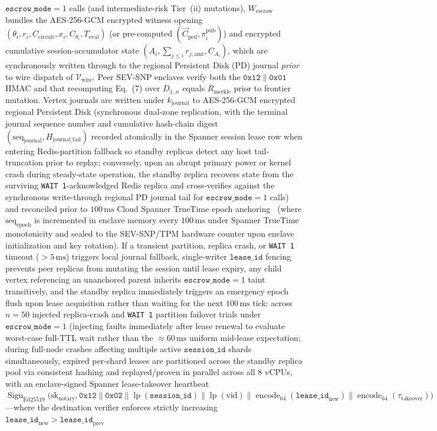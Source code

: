 \documentclass[conference,10pt]{IEEEtran}
\begin{document}
{\begin{enumerate}
$\texttt{escrow\_mode} = 1$ calls (and intermediate-risk Tier~(ii) mutations), $W_{\text{escrow}}$ bundles the AES-256-GCM encrypted witness opening $(\theta_i, r_i, C_{\text{circuit}}, x_i, C_{\theta_i}, T_{\text{eval}})$ (or pre-computed $(\vec{C}_{\text{ped}}, \pi_i^{\text{pub}})$) and encrypted cumulative session-accumulator state $(A_i, \sum_{j \le i} r_{j,\text{amt}}, C_{A_i})$, which are synchronously written through to the regional Persistent Disk (PD) journal \emph{prior} to wire dispatch of $\mathcal{V}_{\text{wire}}$. Peer SEV-SNP enclaves verify both the $\mathtt{0x12} \parallel \mathtt{0x01}$ HMAC and that recomputing Eq.~(7) over $D_{1..n}$ equals $R_{\text{merkle}}$ prior to frontier mutation. Vertex journals are written under $k_{\text{journal}}$ to AES-256-GCM encrypted regional Persistent Disk (synchronous dual-zone replication, with the terminal journal sequence number and cumulative hash-chain digest $(\text{seq}_{\text{journal}}, H_{\text{journal\_tail}})$ recorded atomically in the Spanner session lease row when entering Redis-partition fallback so standby replicas detect any host tail-truncation prior to replay; conversely, upon an abrupt primary power or kernel crash during steady-state operation, the standby replica recovers state from the surviving \texttt{WAIT 1}-acknowledged Redis replica and cross-verifies against the synchronous write-through regional PD journal tail for $\texttt{escrow\_mode} = 1$ calls) and reconciled prior to $100\,\text{ms}$ Cloud Spanner TrueTime epoch anchoring~\cite{corbett2013spanner} (where $\text{seq}_{\text{epoch}}$ is incremented in enclave memory every $100\,\text{ms}$ under Spanner TrueTime monotonicity and sealed to the SEV-SNP/TPM hardware counter upon enclave initialization and key rotation). If a transient partition, replica crash, or \texttt{WAIT 1} timeout ($> 5\,\text{ms}$) triggers local journal fallback, single-writer $\texttt{lease\_id}$ fencing prevents peer replicas from mutating the session until lease expiry, any child vertex referencing an unanchored parent inherits $\texttt{escrow\_mode} = 1$ taint transitively, and the standby replica immediately triggers an emergency epoch flush upon lease acquisition rather than waiting for the next $100\,\text{ms}$ tick: across $n = 50$ injected replica-crash and \texttt{WAIT 1} partition failover trials under $\texttt{escrow\_mode} = 1$ (injecting faults immediately after lease renewal to evaluate worst-case full-TTL wait rather than the $\approx 60\,\text{ms}$ uniform mid-lease expectation; during full-node crashes affecting multiple active $\texttt{session\_id}$ shards simultaneously, expired per-shard leases are partitioned across the standby replica pool via consistent hashing and replayed/proven in parallel across all 8 vCPUs, with an enclave-signed Spanner lease-takeover heartbeat $\operatorname{Sign}_{\text{Ed25519}}\big(\text{sk}_{\text{notary}}, \mathtt{0x12} \parallel \mathtt{0x02} \parallel \operatorname{lp}(\texttt{session\_id}) \parallel \operatorname{lp}(\text{vid}) \parallel \operatorname{encode}_{64}(\texttt{lease\_id}_{\text{new}}) \parallel \operatorname{encode}_{64}(\tau_{\text{takeover}})\big)$---where the destination verifier enforces strictly increasing $\texttt{lease\_id}_{\text{new}} > \texttt{lease\_id}_{\text{prev}}$ 
\end{enumerate}}
\end{document}
